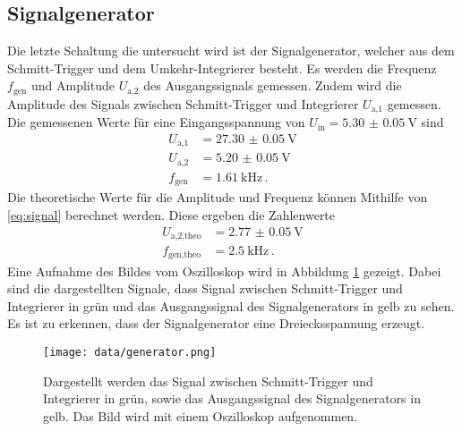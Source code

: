 \subsection{Signalgenerator}
Die letzte Schaltung die untersucht wird ist der Signalgenerator, welcher aus dem Schmitt-Trigger und dem Umkehr-Integrierer besteht.
Es werden die Frequenz $f_\text{gen}$ und Amplitude $U_\text{a,2}$ des Ausgangssignals gemessen.
Zudem wird die Amplitude des Signals zwischen Schmitt-Trigger und Integrierer $U_\text{a,1}$ gemessen.
Die gemessenen Werte für eine Eingangsspannung von $U_\text{in} = \SI{5.30(5)}{\V}$ sind 
\begin{align*}
    U_\text{a,1} &= \SI{27.30(5)}{\V} \\
    U_\text{a,2} &= \SI{5.20(5)}{\V} \\
    f_\text{gen} &= \SI{1.61}{\kilo\Hz} \, .
\end{align*}
Die theoretische Werte für die Amplitude und Frequenz können Mithilfe von \autoref{eq:signal} berechnet werden.
Diese ergeben die Zahlenwerte 
\begin{align*}
    U_\text{a,2,theo} &= \SI{2.77(5)}{\V} \\
    f_\text{gen,theo} &= \SI{2.5}{\kilo\Hz} \, .
\end{align*}
Eine Aufnahme des Bildes vom Oszilloskop wird in Abbildung \ref{fig:gen_oszi} gezeigt.
Dabei sind die dargestellten Signale, dass Signal zwischen Schmitt-Trigger und Integrierer in grün und das Ausgangssignal des Signalgenerators in gelb zu sehen.
Es ist zu erkennen, dass der Signalgenerator eine Dreiecksspannung erzeugt.
\begin{figure}[H]
    \centering
    \texttt{[image: data/generator.png]}
    \caption{Dargestellt werden das Signal zwischen Schmitt-Trigger und Integrierer in grün, sowie das Ausgangssignal des Signalgenerators in gelb.
    Das Bild wird mit einem Oszilloskop aufgenommen.}
    \label{fig:gen_oszi}
\end{figure}




